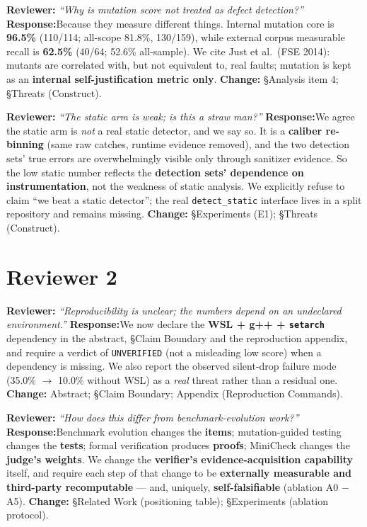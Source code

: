 \documentclass[11pt]{article}
\newcommand{\rev}[1]{\textbf{\color{blue}Reviewer:} \emph{``#1''}}
\newcommand{\resp}{\textbf{\color{red}Response:}}
\newcommand{\chg}[1]{\textbf{Change:} #1}
\begin{document}
\rev{Why is mutation score not treated as defect detection?}
\resp Because they measure different things. Internal mutation core is \textbf{96.5\%} (110/114;
all-scope 81.8\%, 130/159), while external corpus measurable recall is \textbf{62.5\%} (40/64;
52.6\% all-sample). We cite Just et al.\ (FSE 2014): mutants are correlated with, but not equivalent
to, real faults; mutation is kept as an \textbf{internal self-justification metric only}.
\chg{\S Analysis item 4; \S Threats (Construct).}

\rev{The static arm is weak; is this a straw man?}
\resp We agree the static arm is \emph{not} a real static detector, and we say so. It is a
\textbf{caliber re-binning} (same raw catches, runtime evidence removed), and the two detection
sets' true errors are overwhelmingly visible only through sanitizer evidence. So the low static
number reflects the \textbf{detection sets' dependence on instrumentation}, not the weakness of
static analysis. We explicitly refuse to claim ``we beat a static detector''; the real
\texttt{detect\_static} interface lives in a split repository and remains missing.
\chg{\S Experiments (E1); \S Threats (Construct).}

\section*{Reviewer 2}

\rev{Reproducibility is unclear; the numbers depend on an undeclared environment.}
\resp We now declare the \textbf{WSL + g++ + \texttt{setarch}} dependency in the abstract, \S Claim
Boundary and the reproduction appendix, and require a verdict of \texttt{UNVERIFIED} (not a
misleading low score) when a dependency is missing. We also report the observed silent-drop failure
mode (35.0\% $\to$ 10.0\% without WSL) as a \emph{real} threat rather than a residual one.
\chg{Abstract; \S Claim Boundary; Appendix (Reproduction Commands).}

\rev{How does this differ from benchmark-evolution work?}
\resp Benchmark evolution changes the \textbf{items}; mutation-guided testing changes the
\textbf{tests}; formal verification produces \textbf{proofs}; MiniCheck changes the \textbf{judge's
weights}. We change the \textbf{verifier's evidence-acquisition capability} itself, and require each
step of that change to be \textbf{externally measurable and third-party recomputable} --- and,
uniquely, \textbf{self-falsifiable} (ablation A0 $-$ A5).
\chg{\S Related Work (positioning table); \S Experiments (ablation protocol).}
\end{document}

